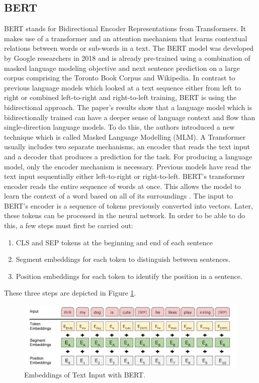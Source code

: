 \subsection{BERT} \label{bert}
BERT  stands  for  Bidirectional Encoder Representations from Transformers. It makes use of a transformer and an attention mechanism that learns contextual relations between words or sub-words in a text. The BERT model was developed by Google researchers in 2018 and is already pre-trained using a combination of masked language modeling objective and next sentence prediction on a large corpus comprising the Toronto Book Corpus and Wikipedia. In contrast to previous language models which looked at a text sequence either from left to right or combined left-to-right and right-to-left training, BERT is using the bidirectional approach. The paper’s results show that a language model which is bidirectionally trained can have a deeper sense of language context and flow than single-direction language models. To do this, the authors introduced a new technique which is called Masked Language Modelling (MLM). \newline
A Transformer usually includes two separate mechanisms, an encoder that reads the text input and a decoder that produces a prediction for the task. For producing a language model, only the encoder mechanism is necessary. Previous models have read the text input sequentially either left-to-right or right-to-left. BERT's transformer encoder reads the entire sequence of words at once. This allows the model to learn the context of a word based on all of its surroundings\alert{ \cite{Devlin}}.  \newline
The input to BERT's encoder is a sequence of tokens previously converted into vectors. Later, these tokens can be processed in the neural network. In order to be able to do this, a few steps must first be carried out:
\begin{enumerate}
	\item CLS and SEP tokens at the beginning and end of each sentence
	\item Segment embeddings for each token to distinguish between sentences.
	\item Position embeddings for each token to identify the position in a sentence.
\end{enumerate}
These three steps are depicted in Figure \ref{fig:bert_tokenizing}.

\begin{figure}[H]
	\centering
	\includegraphics[width=1\textwidth]{figures/bert_tokenizing.png}
	\caption{Embeddings of Text Input with BERT.}
	\label{fig:bert_tokenizing}
\end{figure}

